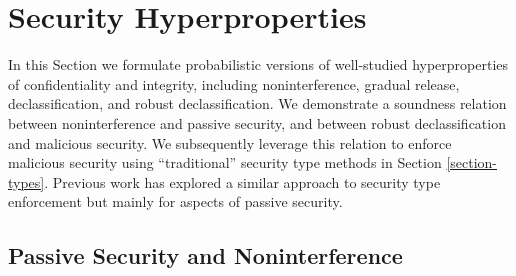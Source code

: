 \section{Security Hyperproperties}

In this Section we formulate probabilistic versions of well-studied
hyperproperties of confidentiality and integrity, including noninterference,
gradual release, declassification, and robust declassification.
We demonstrate a soundness relation between noninterference and
passive security, and between robust declassification and malicious
security. We subsequently leverage this relation to enforce
malicious security using ``traditional'' security type methods
in Section \ref{section-types}. Previous work has explored
a similar approach to security type enforcement
\cite{6266151,almeida2018enforcing} but mainly
for aspects of passive security.

\subsection{Passive Security and Noninterference}

